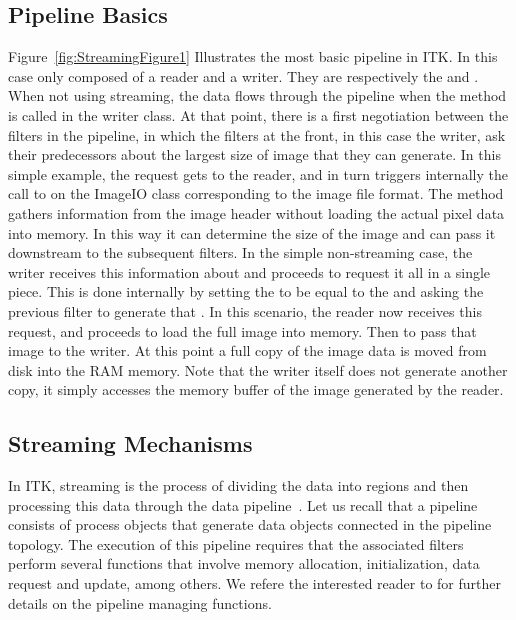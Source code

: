 \documentclass{InsightArticle}
\begin{document}
\subsection{Pipeline Basics}
Figure~\ref{fig:StreamingFigure1} Illustrates the most basic pipeline in ITK.
In this case only composed of a reader and a writer. They are respectively the
 and . When not using streaming,
the data flows through the pipeline when the method  is called in
the writer class. At that point, there is a first negotiation between the filters
in the pipeline, in which the filters at the front, in this case the writer, ask
their predecessors about the largest size of image that they can generate. In this
simple example, the request gets to the reader, and in turn triggers internally
the call to  on the ImageIO class corresponding to
the image file format. The  method gathers information
from the image header without loading the actual pixel data into memory. In this
way it can determine the size of the image  and can
pass it downstream to the subsequent filters. In the simple non-streaming case,
the writer receives this information about  and
proceeds to request it all in a single piece. This is done internally by
setting the  to be equal to the
 and asking the previous filter to generate that
. In this scenario, the reader now receives this request,
and proceeds to load the full image into memory. Then to pass that image to the
writer. At this point a full copy of the image data is moved from disk into the
RAM memory. Note that the writer itself does not generate another copy, it
simply accesses the memory buffer of the image generated by the reader.


\subsection{Streaming Mechanisms}

In ITK, streaming is the process of dividing the data into regions and then
processing this data through the data pipeline~\cite{Ibanez2005}. Let us recall
that a pipeline consists of process objects that generate data objects connected
in the pipeline topology. The execution of this pipeline requires that the
associated filters perform several functions that involve memory allocation,
initialization, data request and update, among others. We refere the interested
reader to \cite{Ibanez2005} for further details on the pipeline managing
functions.
\end{document}
